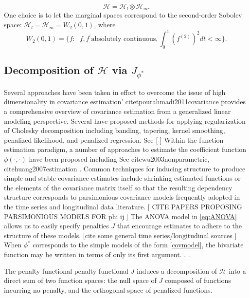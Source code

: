 \documentclass[12pt]{article}
\theoremstyle{definition}
\begin{document}
\[
\mathcal{H} = \mathcal{H}_l \otimes \mathcal{H}_m.
\]
\noindent
One choice is to let the marginal spaces correspond to the second-order Sobolev space: $\mathcal{H}_l = \mathcal{H}_m = W_2\left(0,1\right)$, where
\[
W_2\left(0,1\right) = \lbrace f: \;\;f, f^\prime \mbox{absolutely continuous}, \int_0^1 \left(f^{\left( 2 \right)}\right)^2 dt < \infty \rbrace.
\]  

\subsection{Decomposition of $\mathcal{H}$ via $J_{\phi^*}$}

Several approaches have been taken in effort to overcome the issue of high dimensionality in covariance estimation'  citet{pourahmadi2011covariance} provides a comprehensive overview of covariance estimation from a generalized linear modeling perspective. Several have proposed methods for applying regularization of Cholesky decomposition including banding, tapering, kernel smoothing, penalized likelihood, and penalized regression. See [  ] Within the function estimation paradigm, a number of  approaches to estimate the coefficient function $\phi\left(\cdot,\cdot\right)$ have been proposed including See cite{wu2003nonparametric},  cite{huang2007estimation} .  Common techniques for inducing structure to produce simple and stable covariance estimates include shrinking estimated functions or the elements of the covariance matrix itself so that the resulting dependency structure corresponds to parsimonious covariance models frequently adopted in the time series and longitudinal  data literature.
[
CITE PAPERS PROPOSING PARSIMONIOUS MODELS FOR phi ij
]
The ANOVA model in \ref{eq:ANOVA} allows us to easily specify penalties $J$ that encourage estimates to adhere to the structure of these models.   [cite some general time series/longitudinal sources ] When $\phi^*$ corresponds to the simple models of the form \eqref{covmodel}, the bivariate function may be written in terms of only its first argument. 
. . %


The penalty functional penalty functional $J$ induces a decomposition of $\mathcal{H}$ into a direct sum of two function spaces: the null space of $J$ composed of functions incurring no penalty, and the orthogonal space of penalized functions. 
\end{document}
